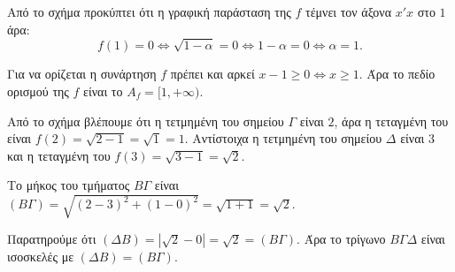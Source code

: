 
\begin{alist}
\item Από το σχήμα προκύπτει ότι η γραφική παράσταση της $f$ τέμνει τον άξονα $x'x$ στο $1$ άρα:
\[f(1) = 0 \Leftrightarrow \sqrt{1 - \alpha} = 0 \Leftrightarrow 1 - \alpha = 0 \Leftrightarrow \alpha = 1.\]

\item Για να ορίζεται η συνάρτηση $f$ πρέπει και αρκεί $x - 1 \ge 0 \Leftrightarrow x \ge 1$. Άρα το πεδίο ορισμού
της $f$ είναι το $A_f = [1, +\infty)$.

\item 
\begin{rlist}
\item Από το σχήμα βλέπουμε ότι η τετμημένη του σημείου $\Gamma$ είναι $2$, άρα η τεταγμένη του
είναι $f(2) = \sqrt{2 - 1} = \sqrt{1} = 1$. Αντίστοιχα η τετμημένη του σημείου $\Delta$ είναι $3$ και η
τεταγμένη του $f(3) = \sqrt{3 - 1} = \sqrt{2}$.

\item Το μήκος του τμήματος $B\Gamma$ είναι $(B\Gamma) = \sqrt{(2 - 3)^2 + (1 - 0)^2} = \sqrt{1 + 1} = \sqrt{2}$. 

\item Παρατηρούμε ότι $(\Delta B) = |\sqrt{2} - 0| = \sqrt{2} = (B\Gamma)$. Άρα το τρίγωνο $B\Gamma\Delta$ είναι ισοσκελές με
$(\Delta B) = (B\Gamma)$.
\end{rlist}
\end{alist}

